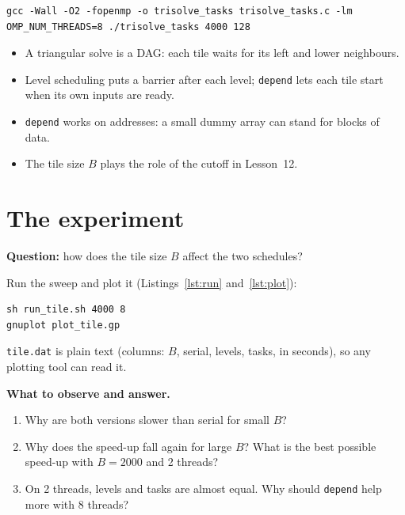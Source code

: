\documentclass[11pt,a4paper]{article}
\let\origtexttt\texttt
\renewcommand{\texttt}[1]{\textcolor{black!60}{\origtexttt{#1}}}
\begin{document}
\begin{lstlisting}[style=sh]
gcc -Wall -O2 -fopenmp -o trisolve_tasks trisolve_tasks.c -lm
OMP_NUM_THREADS=8 ./trisolve_tasks 4000 128
\end{lstlisting}

\begin{keyidea}
\begin{itemize}
  \item A triangular solve is a DAG: each tile waits for its left and lower neighbours.
  \item Level scheduling puts a barrier after each level; \texttt{depend} lets each tile start
        when its own inputs are ready.
  \item \texttt{depend} works on addresses: a small dummy array can stand for blocks of data.
  \item The tile size $B$ plays the role of the cutoff in Lesson~12.
\end{itemize}
\end{keyidea}

\section{The experiment}
\begin{experiment}
\textbf{Question:} how does the tile size $B$ affect the two schedules?

Run the sweep and plot it (Listings~\ref{lst:run} and~\ref{lst:plot}):
\begin{lstlisting}[style=sh]
sh run_tile.sh 4000 8
gnuplot plot_tile.gp
\end{lstlisting}
\texttt{tile.dat} is plain text (columns: $B$, serial, levels, tasks, in seconds), so any
plotting tool can read it.

\textbf{What to observe and answer.}
\begin{enumerate}
  \item Why are both versions slower than serial for small $B$?
  \item Why does the speed-up fall again for large $B$? What is the best possible speed-up
        with $B=2000$ and 2 threads?
  \item On 2 threads, levels and tasks are almost equal. Why should \texttt{depend} help more
        with 8 threads?
\end{enumerate}
\end{experiment}


\end{document}
